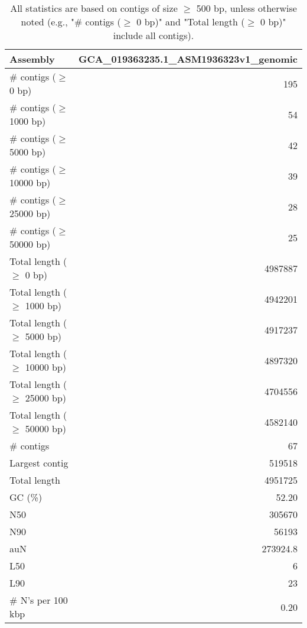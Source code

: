 \documentclass[12pt,a4paper]{article}
\begin{document}
\begin{table}[ht]
\begin{center}
\caption{All statistics are based on contigs of size $\geq$ 500 bp, unless otherwise noted (e.g., "\# contigs ($\geq$ 0 bp)" and "Total length ($\geq$ 0 bp)" include all contigs).}
\begin{tabular}{|l*{1}{|r}|}
\hline
Assembly & GCA\_019363235.1\_ASM1936323v1\_genomic \\ \hline
\# contigs ($\geq$ 0 bp) & 195 \\ \hline
\# contigs ($\geq$ 1000 bp) & 54 \\ \hline
\# contigs ($\geq$ 5000 bp) & 42 \\ \hline
\# contigs ($\geq$ 10000 bp) & 39 \\ \hline
\# contigs ($\geq$ 25000 bp) & 28 \\ \hline
\# contigs ($\geq$ 50000 bp) & 25 \\ \hline
Total length ($\geq$ 0 bp) & 4987887 \\ \hline
Total length ($\geq$ 1000 bp) & 4942201 \\ \hline
Total length ($\geq$ 5000 bp) & 4917237 \\ \hline
Total length ($\geq$ 10000 bp) & 4897320 \\ \hline
Total length ($\geq$ 25000 bp) & 4704556 \\ \hline
Total length ($\geq$ 50000 bp) & 4582140 \\ \hline
\# contigs & 67 \\ \hline
Largest contig & 519518 \\ \hline
Total length & 4951725 \\ \hline
GC (\%) & 52.20 \\ \hline
N50 & 305670 \\ \hline
N90 & 56193 \\ \hline
auN & 273924.8 \\ \hline
L50 & 6 \\ \hline
L90 & 23 \\ \hline
\# N's per 100 kbp & 0.20 \\ \hline
\end{tabular}
\end{center}
\end{table}
\end{document}
